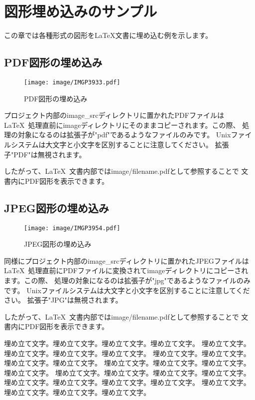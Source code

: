 \chapter{図形埋め込みのサンプル}
\label{sec:figure_sample}

この章では各種形式の図形を\LaTeX 文書に埋め込む例を示します。

\section{PDF図形の埋め込み}
\begin{wrapfigure}[9]{O}[0pt]{0\textwidth}
    \texttt{[image: image/IMGP3933.pdf]}
    \caption{PDF図形の埋め込み}\label{embeded_pdf}
\end{wrapfigure}

プロジェクト内部のimage\_srcディレクトリに置かれたPDFファイルは\LaTeX\
処理直前にimageディレクトリにそのままコピーされます。この際、
処理の対象になるのは拡張子が"pdf"であるようなファイルのみです。
Unixファイルシステムは大文字と小文字を区別することに注意してください。
拡張子"PDF"は無視されます。

したがって、\LaTeX\ 文書内部ではimage/filename.pdfとして参照することで
文書内にPDF図形を表示できます。

\section{JPEG図形の埋め込み}

\begin{wrapfigure}[9]{O}[0pt]{0\textwidth}
    \texttt{[image: image/IMGP3954.pdf]}
    \caption{JPEG図形の埋め込み}\label{embeded_jpeg}
\end{wrapfigure}

同様にプロジェクト内部のimage\_srcディレクトリに置かれたJPEGファイルは\LaTeX\
処理直前にPDFファイルに変換されてimageディレクトリにコピーされます。この際、
処理の対象になるのは拡張子が"jpg"であるようなファイルのみです。
Unixファイルシステムは大文字と小文字を区別することに注意してください。
拡張子"JPG"は無視されます。

したがって、\LaTeX\ 文書内部ではimage/filename.pdfとして参照することで
文書内にPDF図形を表示できます。

埋め立て文字。埋め立て文字。埋め立て文字。埋め立て文字。
埋め立て文字。埋め立て文字。埋め立て文字。埋め立て文字。
埋め立て文字。埋め立て文字。埋め立て文字。埋め立て文字。
埋め立て文字。埋め立て文字。埋め立て文字。埋め立て文字。
埋め立て文字。埋め立て文字。埋め立て文字。埋め立て文字。
埋め立て文字。埋め立て文字。埋め立て文字。埋め立て文字。
埋め立て文字。埋め立て文字。埋め立て文字。埋め立て文字。

